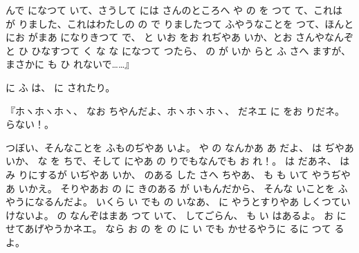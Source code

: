 んで
になつて
いて、さうして
には
さんのところへ
や
の
を
つて
て、これは
が
りました、これはわたしの
の
で
りましたつて
ふやうなことを
つて、ほんとにお
がまあ
になりきつて
で、
と
いお
をお
れぢやあ
いか、とお
さんやなんぞと
ひ
ひなすつて
く
な
な
になつて
つたら、
の
が
いか
らと
ふ
さへ
ますが、まさかに
も
ひ
れないで……』

に
ふ
は、
に
されたり。

『ホヽホヽホヽ、
なお
ちやんだよ、ホヽホヽホヽ、
だネエ
に
をお
りだネ。
らない！。

つぼい、そんなことを
ふものぢやあ
いよ。
や
の
なんかあ
あ
だよ、
は
ぢやあ
いか、
な
を
ちで、そして
にやあ
の
りでもなんでも
お
れ！。
は
だあネ、
は
み
りにするが
いぢやあ
いか、
のある
した
さへ
ちやあ、
も
も
いて
やうぢやあ
いかえ。
そりやあお
の
に
きのある
が
いもんだから、
そんな
いことを
ふやうになるんだよ。
いくら
い
でも
の
いなあ、
に
やうとすりやあ
しくつていけないよ。
の
なんぞはまあ
つて
いて、
してごらん、
も
い
はあるよ。
お
に
せてあげやうかネエ。
なら
お
の
を
の
に
い
でも
かせるやうに
るに
つて
るよ。

